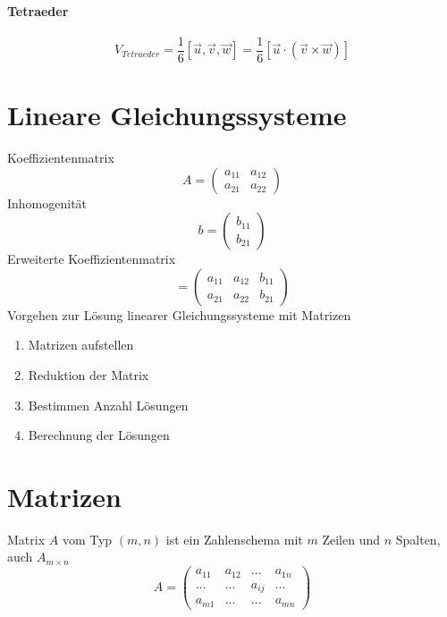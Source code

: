 \documentclass{report}
\begin{document}
\subsubsection{Tetraeder}
\begin{equation}V_{Tetraeder} = \frac{1}{6}[\vec{u}, \vec{v}, \vec{w}] = \frac{1}{6}[\vec{u} \cdot (\vec{v} \times \vec{w})]\end{equation}
\chapter{Lineare Gleichungssysteme}
Koeffizientenmatrix
\begin{equation}A = \left(\begin{matrix}a_{11} & a_{12}\\a_{21} & a_{22}\end{matrix}\right)\end{equation}
Inhomogenität
\begin{equation}b = \left(\begin{matrix}b_{11} \\ b_{21}\end{matrix}\right)\end{equation}
Erweiterte Koeffizientenmatrix
\begin{equation}[A,b] = \left(\begin{matrix}a_{11} & a_{12} & b_{11}\\a_{21} & a_{22} & b_{21}\end{matrix}\right)\end{equation}
Vorgehen zur Lösung linearer Gleichungssysteme mit Matrizen
\begin{enumerate}\item Matrizen aufstellen
\item Reduktion der Matrix
\item Bestimmen Anzahl Lösungen
\item Berechnung der Lösungen\end{enumerate}
\chapter{Matrizen}
Matrix $A$ vom Typ $(m,n)$ ist ein Zahlenschema mit $m$ Zeilen und $n$ Spalten, auch $A_{m \times n}$
\begin{equation}A = \left(\begin{matrix}a_{11} & a_{12} & ... & a_{1n}\\... & ... & a_{ij} & ...\\a_{m1} & ... & ... & a_{mn}\end{matrix}\right)\end{equation}
\end{document}
